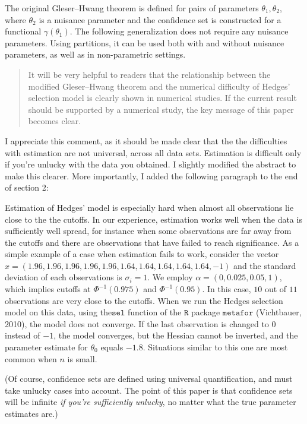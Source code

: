 \documentclass[a4paper]{article}
\begin{document}
{\color{red} The original Gleser--Hwang theorem is defined for pairs of parameters $\theta_1,\theta_2$, where $\theta_2$ is a nuisance parameter and the confidence set is constructed for a functional $\gamma(\theta_1)$. The following generalization does not require any nuisance parameters. Using partitions, it can be used both with and without nuisance parameters, as well as in non-parametric settings.}

\begin{quotation}
It will be very helpful to readers that the relationship between the modified Gleser--Hwang theorem and the numerical difficulty of Hedges’ selection model is clearly shown in numerical studies. If the current result should be supported by a numerical study, the key message of this paper becomes clear.
\end{quotation}

I appreciate this comment, as it should be made clear that the the difficulties with estimation are not universal, across all data sets. Estimation is difficult only if you're unlucky with the data you obtained. I slightly modified the abstract to make this clearer. More importantly, I added the following paragraph to the end of section 2:

{\color{red} Estimation of Hedges' model is especially hard when almost all observations lie close to the the cutoffs. In our experience, estimation works well when the data is sufficiently well spread, for instance when some observations are far away from the cutoffs and there are observations that have failed to reach significance. As a simple example of a case when estimation fails to work, consider the vector $x = (1.96, 1.96, 1.96, 1.96, 1.96, 1.64, 1.64, 1.64, 1.64, 1.64, -1)$ and the standard deviation of each observations is $\sigma_i=1$. We employ $\alpha = (0, 0.025, 0.05, 1)$, which implies cutoffs at $\Phi^{-1}(0.975)$ and $\Phi^{-1}(0.95)$. In this case, $10$ out of $11$ observations are very close to the cutoffs. When we run the Hedges selection model on this data, using the$\mathtt{sel}$ function of the $\mathtt{R}$ package $\mathtt{metafor}$ (Vichtbauer, 2010), the model does not converge. If the last observation is changed to $0$ instead of $-1$, the model converges, but the Hessian cannot be inverted, and the parameter estimate for $\theta_0$ equals $-1.8$. Situations similar to this one are most common when $n$ is small.}

(Of course, confidence sets are defined using universal quantification, and must take unlucky cases into account. The point of this paper is that confidence sets will be infinite \textit{if you're sufficiently unlucky}, no matter what the true parameter estimates are.)
\end{document}
